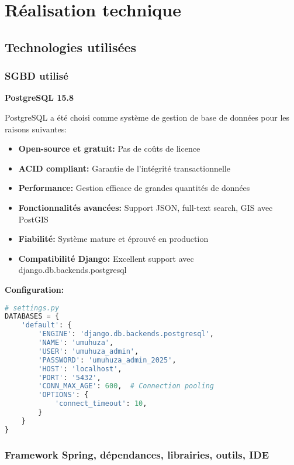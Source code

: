 \chapter{Réalisation technique}

\section{Technologies utilisées}

\subsection{SGBD utilisé}

\textbf{PostgreSQL 15.8}

PostgreSQL a été choisi comme système de gestion de base de données pour les raisons suivantes:
\begin{itemize}
    \item \textbf{Open-source et gratuit:} Pas de coûts de licence
    \item \textbf{ACID compliant:} Garantie de l'intégrité transactionnelle
    \item \textbf{Performance:} Gestion efficace de grandes quantités de données
    \item \textbf{Fonctionnalités avancées:} Support JSON, full-text search, GIS avec PostGIS
    \item \textbf{Fiabilité:} Système mature et éprouvé en production
    \item \textbf{Compatibilité Django:} Excellent support avec django.db.backends.postgresql
\end{itemize}

\textbf{Configuration:}
\begin{lstlisting}[language=Python]
# settings.py
DATABASES = {
    'default': {
        'ENGINE': 'django.db.backends.postgresql',
        'NAME': 'umuhuza',
        'USER': 'umuhuza_admin',
        'PASSWORD': 'umuhuza_admin_2025',
        'HOST': 'localhost',
        'PORT': '5432',
        'CONN_MAX_AGE': 600,  # Connection pooling
        'OPTIONS': {
            'connect_timeout': 10,
        }
    }
}
\end{lstlisting}

\subsection{Framework Spring, dépendances, librairies, outils, IDE}

